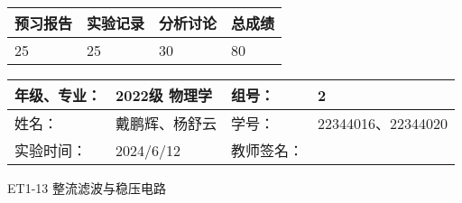 \documentclass[dvipsnames, svgnames,a4paper,11pt]{article}
\begin{document}
	
	
	
	
	\begin{table}
		\renewcommand\arraystretch{1.7}
		\begin{tabularx}{\textwidth}{
				|X|X|X|X
				|X|X|X|X|}
			\hline
			\multicolumn{2}{|c|}{预习报告}&\multicolumn{2}{|c|}{实验记录}&\multicolumn{2}{|c|}{分析讨论}&\multicolumn{2}{|c|}{总成绩}\\
			\hline
			\LARGE25 & & \LARGE25 & & \LARGE30 & & \LARGE80 & \\
			\hline
		\end{tabularx}
	\end{table}
	
	\begin{table}
		\renewcommand\arraystretch{1.7}
		\begin{tabularx}{\textwidth}{|X|X|X|X|}
			\hline
			年级、专业： & 2022级 物理学 &组号： & 2\\
			\hline
			姓名： & 戴鹏辉、杨舒云  & 学号： & 22344016、22344020\\
			\hline
			实验时间： & 2024/6/12 & 教师签名： & \\
			\hline
		\end{tabularx}
	\end{table}
	
	\begin{center}
		\LARGE ET1-13 \quad 整流滤波与稳压电路
	\end{center}
	
	
\end{document}
